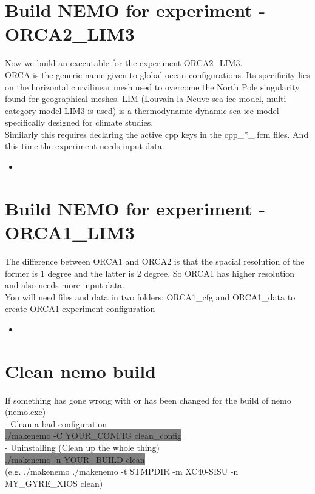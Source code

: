 \documentclass[11pt]{article}
\newcommand{\insertcode}[2]{\begin{itemize}\item[]\end{itemize}} %
\begin{document}
\section{Build NEMO for experiment - ORCA2\_LIM3}
Now we build an executable for the experiment ORCA2\_LIM3.\\
ORCA is the generic name given to global ocean configurations. Its specificity lies on the horizontal curvilinear mesh used to overcome the North Pole singularity found for geographical meshes. LIM (Louvain-la-Neuve sea-ice model, multi-category model LIM3 is used) is a thermodynamic-dynamic sea ice model specifically designed for climate studies.\\
Similarly this requires declaring the active cpp keys in the cpp\_*\_.fcm files. And this time the experiment needs input data.
\insertcode{"./launch_ORCA2_LIM3.bash"}{} %
\section{Build NEMO for experiment - ORCA1\_LIM3}
The difference between ORCA1 and ORCA2 is that the spacial resolution of the former is 1 degree and the latter is 2 degree. So ORCA1 has higher resolution and also needs more input data.\\
You will need files and data in two folders: ORCA1\_cfg and ORCA1\_data to create ORCA1 experiment configuration
\insertcode{"./launch_ORCA1_LIM3.bash"}{} %
\section{Clean nemo build}
If something has gone wrong with or has been changed for the build of nemo (nemo.exe)\\
-	Clean a bad configuration \\
\colorbox{Grey}{./makenemo -C YOUR\_CONFIG clean\_config}\\
-	Uninstalling (Clean up the whole thing)\\
\colorbox{Grey}{./makenemo -n YOUR\_BUILD clean}\\
(e.g. ./makenemo ./makenemo -t \$TMPDIR -m XC40-SISU -n MY\_GYRE\_XIOS clean)
\end{document}
